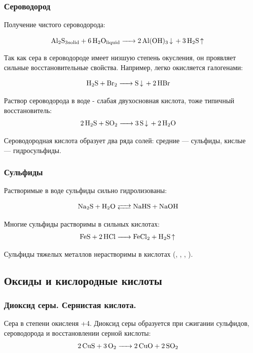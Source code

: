 \subsubsection{Сероводород}
Получение чистого сероводорода:

\begin{equation*}
\ce{Al2S3_{solid} + 6H2O_{liquid} -> 2Al(OH)3 v + 3H2S ^}
\end{equation*}

Так как сера в сероводороде имеет низшую степень окусления, он проявляет сильные восстановительные свойства. Например, легко окисляется галогенами:

\begin{equation*}
\ce{H2S + Br2 -> S v + 2 HBr}
\end{equation*}

Раствор сероводорода в воде - слабая двухосновная кислота, тоже типичный восстановитель:
\begin{equation*}
\ce{2H2S + SO2 -> 3S v + 2H2O}
\end{equation*}

Сероводородная кислота образует два ряда солей: средние --- сульфиды, кислые --- гидросульфиды.
\subsubsection{Сульфиды}

Растворимые в воде сульфиды сильно гидролизованы:

\begin{equation*}
\ce{Na2S + H2O <--> NaHS + NaOH}
\end{equation*}

Многие сульфиды растворимы в сильных кислотах:
\begin{equation*}
\ce{FeS + 2HCl -> FeCl2 + H2S ^}
\end{equation*}

Сульфиды тяжелых металлов нерастворимы в кислотах (, , , ).

\subsection{Оксиды и кислородные кислоты}
\subsubsection{Диоксид серы. Сернистая кислота.}
Сера в степени окисленя +4.
Диоксид серы образуется при сжигании сульфидов, сероводорода и восстановлении серной кислоты:
\begin{equation*}
\ce{2CuS + 3O2 -> 2CuO + 2SO2}
\end{equation*}

